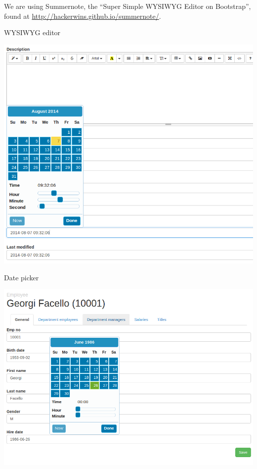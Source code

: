 We are using Summernote, the ``Super Simple WYSIWYG Editor on Bootstrap'',
found at \url{http://hackerwins.github.io/summernote/}.

\begin{frame}[plain]{WYSIWYG editor}
  \begin{center}
    \includegraphics[width=\textwidth,height=1\textheight,keepaspectratio]{images/datepicker-htmleditor.png}
  \end{center}
\end{frame}

\begin{frame}[plain]{Date picker}
  \begin{center}
    \includegraphics[width=\textwidth,height=1\textheight,keepaspectratio]{images/form.png}
  \end{center}
\end{frame}

